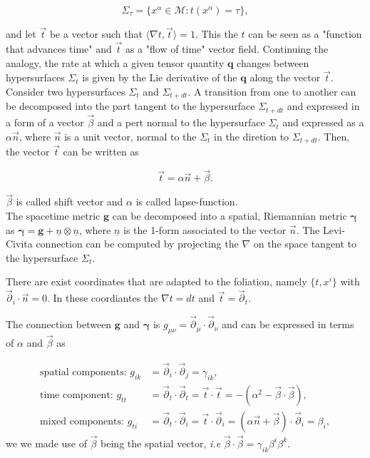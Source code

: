 \documentclass[11pt,a4paper,headinclude=true,DIV=14,BCOR=8mm,chapterprefix,listof=totoc,twoside,openright,abstracton]{scrbook}
\begin{document}
\begin{equation}
    \Sigma_{\tau} = \{x^{\alpha}\in\mathcal{M}: t(x^{\alpha})=\tau\},
\end{equation}

and let $\vec{t}$ be a vector such that $\langle\nabla t, \vec{t}\rangle = 1$. This the $t$ can be seen as a "function that advances time" and $\vec{t}$ as a "flow of time" vector field. Continuing the analogy, the rate at which a given tensor quantity $\boldsymbol{q}$ changes between hypersurfaces $\Sigma_t$ is given by the Lie derivative of the $\boldsymbol{q}$ along the vector $\vec{t}$. \\

Consider two hypersurfaces $\Sigma_t$ and $\Sigma_{t+dt}$. A transition from one to another can be decomposed into the part tangent to the hypersurface $\Sigma_{t+dt}$ and expressed in a form of a vector $\vec{\beta}$ and a pert normal to the hypersurface $\Sigma_t$ and expressed as a $\alpha \vec{n}$, where $\vec{n}$ is a unit vector, normal to the $\Sigma_t$ in the diretion to $\Sigma_{t+dt}$. Then, the vector $\vec{t}$ can be written as 

\begin{equation}
    \vec{t} = \alpha\vec{n}+\vec{\beta}.
\end{equation}

$\vec{\beta}$ is called shift vector and $\alpha$ is called lapse-function. \\

The spacetime metric $\boldsymbol{g}$ can be decomposed into a spatial, Riemannian metric $\boldsymbol{\gamma}$  as $\boldsymbol{\gamma} = \boldsymbol{g} + \underline{n} \otimes \underline{n} $, where $\underline{n}$ is the 1-form associated to the vector $\vec{n}$. The Levi-Civita connection can be computed by projecting the $\nabla$ on the space tangent to the hypersurface $\Sigma_t$.

There are exist coordinates that are adapted to the foliation, namely $\{t, x^i\}$ with $\vec{\partial}_i\cdot \vec{n} = 0$. In these coordiantes the $\nabla t = dt$ and $\vec{t} = \vec{\partial}_t$. 

The connection between $\boldsymbol{g}$ and $\boldsymbol{\gamma}$ is $g_{\mu\nu}=\vec{\partial}_{\mu}\cdot\vec{\partial}_{\nu} $ and can be expressed in terms of $\alpha$ and $\vec{\beta}$ as

\begin{align}
    \text{spatial components: } g_{ik}&=\vec{\partial}_{i}\cdot\vec{\partial}_{j} =\gamma_{ik}, \\
    \text{time component: } g_{tt} &= \vec{\partial}_{t}\cdot\vec{\partial}_{t} = \vec{t}\cdot\vec{t} = - (\alpha^2-\vec{\beta}\cdot\vec{\beta}), \\
    \text{mixed components: } g_{ti} &= \vec{\partial}_{t}\cdot\vec{\partial}_{i} = \vec{t}\cdot\vec{\partial}_i = (\alpha\vec{n}+\vec{\beta})\cdot\vec{\partial}_i=\beta_i,
\end{align}
we we made use of $\vec{\beta}$ being the spatial vector, \textit{i.e} $\vec{\beta}\cdot\vec{\beta}=\gamma_{ik}\beta^i\beta^k$.
\end{document}

